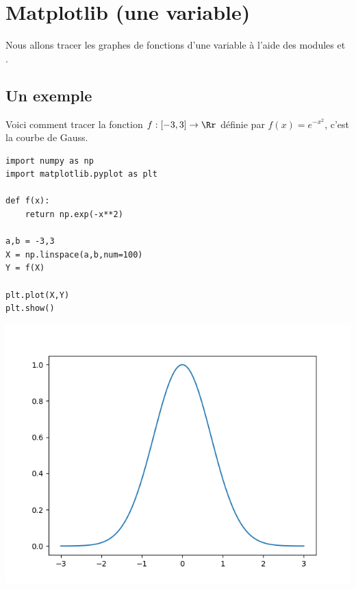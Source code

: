 \documentclass[11pt,class=report,crop=false]{standalone}
\begin{document}
\section{Matplotlib (une variable)}

Nous allons tracer les graphes de fonctions d'une variable à l'aide des modules \matplotlib{} et \numpy{}.

\subsection{Un exemple}

Voici comment tracer la fonction $f : [-3,3] \to \Rr$ définie par $f(x) =e^{-x^2}$, c'est la courbe de Gauss.

\begin{minipage}{0.5\textwidth}
\begin{lstlisting}
import numpy as np
import matplotlib.pyplot as plt

def f(x):
	return np.exp(-x**2)

a,b = -3,3
X = np.linspace(a,b,num=100)
Y = f(X)

plt.plot(X,Y)
plt.show()
\end{lstlisting}
\end{minipage}
\begin{minipage}{0.49\textwidth}
\begin{center}
\includegraphics[scale=\myscale,scale=0.55]{figures/pythonx-gauss}
\end{center}
\end{minipage}
\end{document}
